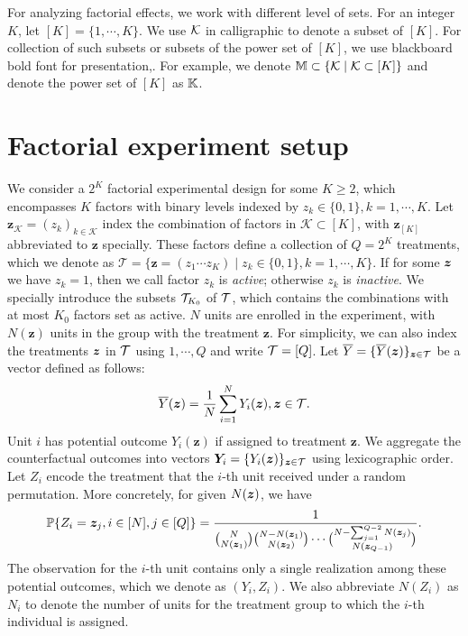 \documentclass[12pt]{article}
\begin{document}
For analyzing factorial effects,  we work with different level of sets. For an integer $K$, let $[K] = \{1,\cdots,K\}$. We use ${\mathcal{K}}$ in calligraphic to denote a subset of $[K]$. For collection of such subsets or subsets of the power set of $[K]$, we use blackboard bold font for presentation,. For example, we denote ${\mathbb{M}} \subset \{{\mathcal{K}}\mid {\mathcal{K}}\subset[K]\}$ and denote the power set of $[K]$ as ${\mathbb{K}}$.


\section{Factorial experiment setup}
We consider a $2^K$ factorial experimental design for some $K\ge 2$, which encompasses $K$ factors with binary levels indexed by $z_k\in\{0,1\},k=1,\cdots, K$. Let $\bm{z}_{\mathcal{K}} = (z_k)_{k\in\mathcal{K}}$ index the combination of factors in $\mathcal{K}\subset[K]$, with $\bm{z}_{[K]}$ abbreviated to $\boldsymbol{z}$ specially. These factors define a collection of $Q = 2^K$ treatments, which we denote as $\mathcal{T}=\{\bm{z}=(z_1\cdots z_K)\mid z_k\in\{0,1\}, k=1,\cdots,K\}$. If for some ${\boldsymbol{z}}$ we have $z_k = 1$, then we call factor $z_k$ is \textit{active}; otherwise $z_k$ is \textit{inactive}. We specially introduce the subsets ${\mathcal{T}}_{K_0}$ of ${\mathcal{T}}$, which contains the  combinations with at most $K_0$ factors set as active.  $N$ units are enrolled in the experiment, with $N(\bm{z})$ units in the group with the treatment $\bm{z}$. For simplicity, we can also index the treatments ${\boldsymbol{z}}$ in ${\mathcal{T}}$ using $1,\cdots,Q$ and write ${\mathcal{T}} = [Q] $. Let $\overline{Y} = \{\overline{Y}({\boldsymbol{z}})\}_{{\boldsymbol{z}}\in{\mathcal{T}}}$ be a vector defined as follows:
\begin{align*}
    \overline{Y}({\boldsymbol{z}}) = \frac{1}{N}\sum_{i=1}^N Y_i({\boldsymbol{z}}),{\boldsymbol{z}}\in{\mathcal{T}}.
\end{align*}
Unit $i$ has potential outcome $Y_i(\bm{z})$ if assigned to treatment $\bm{z}$. We aggregate the counterfactual outcomes into vectors $\bm{Y}_i = \{Y_i({\boldsymbol{z}})\}_{{\boldsymbol{z}}\in{\mathcal{T}}}$ using lexicographic order. Let $Z_i$ encode the treatment that the $i$-th unit received under a random permutation. More concretely, for given $N({\boldsymbol{z}})$, we have
\begin{align*}
    {\mathbb{P}}\{Z_i = {\boldsymbol{z}}_j, i \in [N], j\in[Q]\} = \frac{1}{{N \choose N({\boldsymbol{z}}_1)}{N - N({\boldsymbol{z}}_1) \choose N({\boldsymbol{z}}_2)}\cdots {N - \sum_{j=1}^{Q-2}N({\boldsymbol{z}}_j) \choose N({\boldsymbol{z}}_{Q-1})} }.
\end{align*}  The observation for the $i$-th unit contains only a single realization among these potential outcomes, which we denote as $(Y_i, {Z}_{i})$. We also abbreviate $N(Z_i)$ as $N_i$ to denote the number of units for the treatment group to which the $i$-th individual is assigned.
\end{document}
